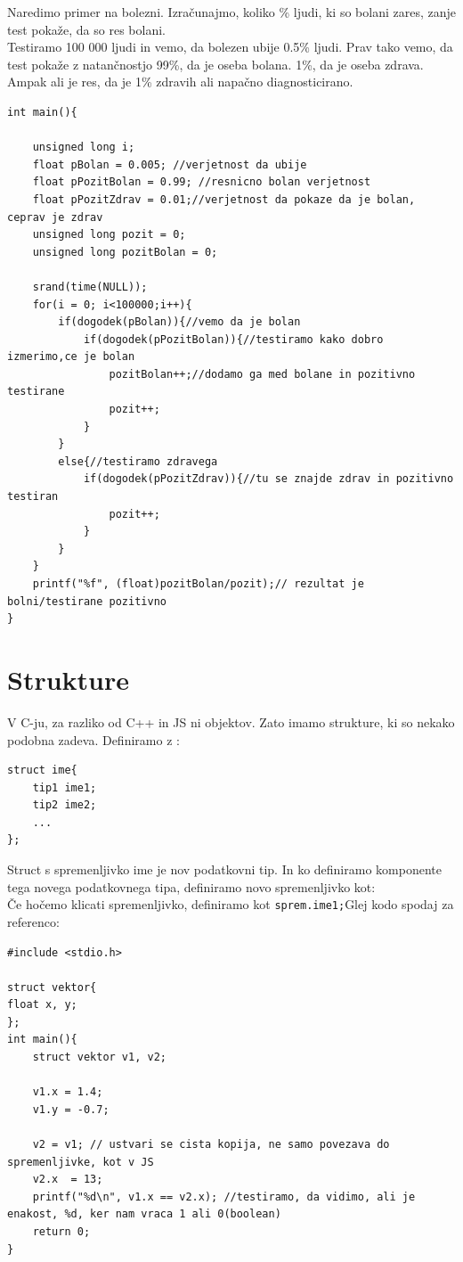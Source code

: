 \documentclass[a4paper, 12pt]{article}
\begin{document}
Naredimo primer na bolezni. Izračunajmo, koliko \% ljudi, ki so bolani zares, zanje test pokaže, da so res bolani.\\
Testiramo 100 000 ljudi in vemo, da bolezen ubije 0.5\% ljudi. Prav tako vemo, da test pokaže z natančnostjo 99\%, da je oseba bolana. 1\%, da je oseba zdrava. Ampak ali je res, da je 1\% zdravih ali napačno diagnosticirano.

\begin{lstlisting}
int main(){

    unsigned long i;
	float pBolan = 0.005; //verjetnost da ubije
	float pPozitBolan = 0.99; //resnicno bolan verjetnost
	float pPozitZdrav = 0.01;//verjetnost da pokaze da je bolan, ceprav je zdrav
	unsigned long pozit = 0;
	unsigned long pozitBolan = 0;
	
	srand(time(NULL));
	for(i = 0; i<100000;i++){
		if(dogodek(pBolan)){//vemo da je bolan
			if(dogodek(pPozitBolan)){//testiramo kako dobro izmerimo,ce je bolan
				pozitBolan++;//dodamo ga med bolane in pozitivno testirane
				pozit++;
			}
		}
		else{//testiramo zdravega
			if(dogodek(pPozitZdrav)){//tu se znajde zdrav in pozitivno testiran
				pozit++;
			}
		}
	}
	printf("%f", (float)pozitBolan/pozit);// rezultat je bolni/testirane pozitivno
}
\end{lstlisting}

\section{Strukture}

V C-ju, za razliko od C++ in JS ni objektov. Zato imamo strukture, ki so nekako podobna zadeva. Definiramo z :
\begin{lstlisting}
struct ime{
	tip1 ime1;
	tip2 ime2;
	...
};
\end{lstlisting}
Struct s spremenljivko ime je nov podatkovni tip. In ko definiramo komponente tega novega podatkovnega tipa, definiramo novo spremenljivko kot: {\centering{}}\\
Če hočemo klicati spremenljivko, definiramo kot \lstinline|sprem.ime1;|Glej kodo spodaj za referenco:

\begin{lstlisting}
#include <stdio.h>

struct vektor{
float x, y;		
};
int main(){
	struct vektor v1, v2;

	v1.x = 1.4;	
	v1.y = -0.7;

	v2 = v1; // ustvari se cista kopija, ne samo povezava do spremenljivke, kot v JS
	v2.x  = 13;
	printf("%d\n", v1.x == v2.x); //testiramo, da vidimo, ali je enakost, %d, ker nam vraca 1 ali 0(boolean)
	return 0;
}
\end{lstlisting}
\end{document}
